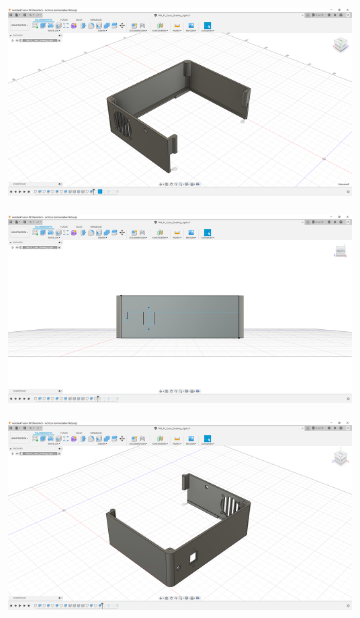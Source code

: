 \begin{figure}[h!tb]
\begin{subfigure}[t]{.3\linewidth}
		\caption[]{}
		\label{fig:design-right-09}
	\end{subfigure}
	\begin{subfigure}[t]{.3\linewidth}
		\includegraphics[width=\linewidth]{img/konstruktion_gehaeuse_rechts_010.png}
		\caption[]{}
		\label{fig:design-right-10}
	\end{subfigure}
	\begin{subfigure}[t]{.3\linewidth}
		\includegraphics[width=\linewidth]{img/konstruktion_gehaeuse_rechts_011.png}
		\caption[]{}
		\label{fig:design-right-11}
	\end{subfigure}
	\begin{subfigure}[t]{.3\linewidth}
		\includegraphics[width=\linewidth]{img/konstruktion_gehaeuse_rechts_012.png}

\end{subfigure}
\end{figure}
